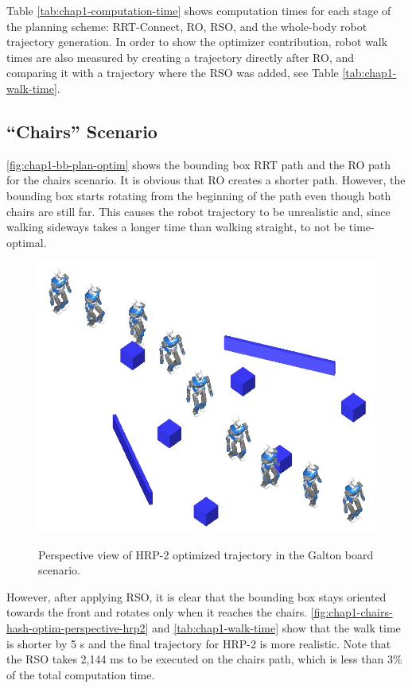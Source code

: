 Table \ref{tab:chap1-computation-time} shows computation times for
each stage of the planning scheme: RRT-Connect, RO, RSO, and the
whole-body robot trajectory generation. In order to show the optimizer
contribution, robot walk times are also measured by creating a
trajectory directly after RO, and comparing it with a trajectory where
the RSO was added, see Table \ref{tab:chap1-walk-time}.

\subsection{``Chairs'' Scenario}
\label{subsec:chap1-chairs}

\autoref{fig:chap1-bb-plan-optim} shows the bounding box RRT path and
the RO path for the chairs scenario. It is obvious that RO creates a
shorter path. However, the bounding box starts rotating from the
beginning of the path even though both chairs are still far. This
causes the robot trajectory to be unrealistic and, since walking
sideways takes a longer time than walking straight, to not be
time-optimal.

\begin{figure}
  \centering
      {\includegraphics[width = 0.8\linewidth]
        {src/chap1-path-optimization/galton-hash-optim-perspective-hrp2.png}}
      \caption{Perspective view of HRP-2 optimized trajectory in the
        Galton board scenario.}
      \label{fig:chap1-galton-hash-optim-perspective-hrp2}
\end{figure}

However, after applying RSO, it is clear that the bounding box stays
oriented towards the front and rotates only when it reaches the
chairs. \autoref{fig:chap1-chairs-hash-optim-perspective-hrp2} and
\autoref{tab:chap1-walk-time} show that the walk time is shorter by 5
s and the final trajectory for HRP-2 is more realistic. Note that the
RSO takes 2,144 ms to be executed on the chairs path, which is less
than 3\% of the total computation time.

